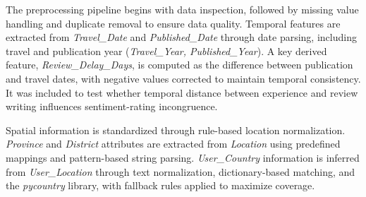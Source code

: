\documentclass[conference]{IEEEtran}
\begin{document}
\begin{table}[htbp]
\caption{Dataset Attributes}
\label{tab:dataset_attributes}
\centering
{}
\end{table}

The preprocessing pipeline begins with data inspection, followed by missing value handling and duplicate removal to ensure data quality. Temporal features are extracted from \textit{Travel\_Date} and \textit{Published\_Date} through date parsing, including travel and publication year (\textit{Travel\_Year, Published\_Year}). A key derived feature, \textit{Review\_Delay\_Days}, is computed as the difference between publication and travel dates, with negative values corrected to maintain temporal consistency. It was included to test whether temporal distance between experience and review writing influences sentiment-rating incongruence.

Spatial information is standardized through rule-based location normalization. \textit{Province} and \textit{District} attributes are extracted from \textit{Location} using predefined mappings and pattern-based string parsing. \textit{User\_Country} information is inferred from \textit{User\_Location} through text normalization, dictionary-based matching, and the \textit{pycountry} library, with fallback rules applied to maximize coverage.
\end{document}
